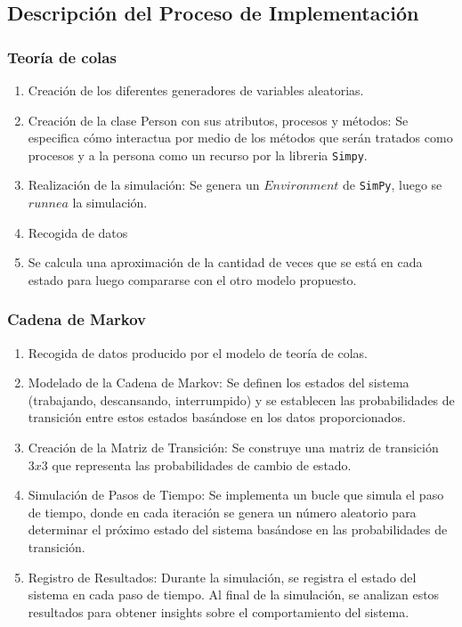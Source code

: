 \documentclass[10pt,a4paper,twocolumn]{article}
\begin{document}
\subsection{Descripción del Proceso de Implementación}

\subsubsection{Teor\'ia de colas}

\begin{enumerate}
    \item Creación de los diferentes generadores de variables aleatorias.
    \item Creaci\'on de la clase Person con sus atributos, procesos y m\'etodos: Se especifica c\'omo interactua por medio de los m\'etodos que ser\'an tratados como procesos y a la persona como un recurso por la libreria \texttt{Simpy}.
    \item Realizaci\'on de la simulaci\'on: Se genera un $Environment$ de \texttt{SimPy}, luego se $runnea$ la simulaci\'on.
    \item Recogida de datos
    \item Se calcula  una aproximaci\'on de la cantidad de veces que se est\'a en cada estado para luego compararse con el otro modelo propuesto. 
\end{enumerate}

\subsubsection{Cadena de Markov}

\begin{enumerate}
    \item Recogida de datos producido por el modelo de teor\'ia de colas.
    \item Modelado de la Cadena de Markov: Se definen los estados del sistema (trabajando, descansando, interrumpido) y se establecen las probabilidades de transición entre estos estados basándose en los datos proporcionados.
    \item Creación de la Matriz de Transición: Se construye una matriz de transición $3x3$ que representa las probabilidades de cambio de estado.
    \item Simulación de Pasos de Tiempo: Se implementa un bucle que simula el paso de tiempo, donde en cada iteración se genera un número aleatorio para determinar el próximo estado del sistema basándose en las probabilidades de transición.
    \item Registro de Resultados: Durante la simulación, se registra el estado del sistema en cada paso de tiempo. Al final de la simulación, se analizan estos resultados para obtener insights sobre el comportamiento del sistema.
\end{enumerate}
\end{document}
